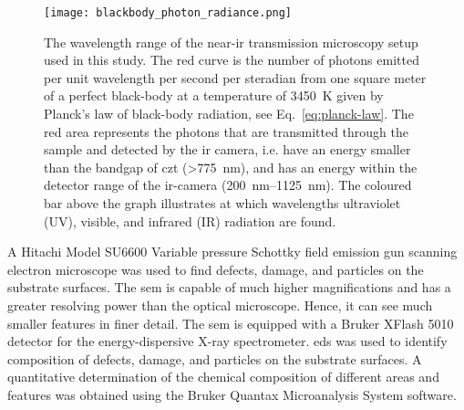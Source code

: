 \begin{figure}[htbp]
    \centering
    \texttt{[image: blackbody\_photon\_radiance.png]}
    \caption[Graph showing the wavelength range of the near-\ac{ir} transmission microscopy setup.]{The wavelength range of the near-\ac{ir} transmission microscopy setup used in this study. The red curve is the number of photons emitted per unit wavelength per second per steradian from one square meter of a perfect black-body at a temperature of \SI{3450}{\kelvin} given by Planck's law of black-body radiation, see Eq.~\eqref{eq:planck-law}. The red area represents the photons that are transmitted through the sample and detected by the \ac{ir} camera, i.e. have an energy smaller than the bandgap of \ac{czt} (\SI{>775}{\nano\metre}),  and has an energy within the detector range of the \ac{ir}-camera (\SIrange{200}{1125}{\nano\metre}). The coloured bar above the graph illustrates at which wavelengths ultraviolet (UV), visible, and infrared (IR) radiation are found.}
    \label{fig:ir-range}
\end{figure}

A Hitachi Model SU6600 Variable pressure Schottky field emission gun scanning electron microscope was used to find defects, damage, and particles on the substrate surfaces. The \ac{sem} is capable of much higher magnifications and has a greater resolving power than the optical microscope. Hence, it can see much smaller features in finer detail. The \ac{sem} is equipped with a Bruker XFlash 5010 detector for the energy-dispersive X-ray spectrometer. \Ac{eds} was used to identify composition of defects, damage, and particles on the substrate surfaces. A quantitative determination of the chemical composition of different areas and features was obtained using the Bruker Quantax Microanalysis System software.

